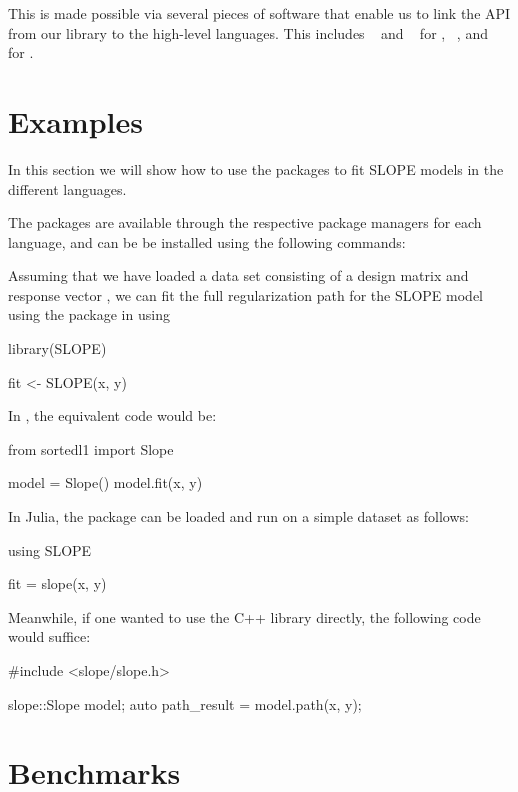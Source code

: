 \documentclass[article]{jss}
\begin{document}
This is made possible via several pieces of software that enable us to link the
API from our  library to the high-level languages. This includes
~\citep{eddelbuettel2011} and ~\citep{bates2013} for
, ~\citep{jakob2025}, and ~\citep{janssens2020} for
.

\section{Examples}

In this section we will show how to use the packages to fit SLOPE models in
the different languages.

The packages are
available through the respective package managers for each language, and can be
be installed using the following commands:

\begin{description}[labelwidth=8ex]
  \item[\proglang{R}] 
  \item[\proglang{Python}] 
  \item[\proglang{Julia}] 
\end{description}

Assuming that we have loaded a data set consisting of a design
matrix  and response vector , we can fit the full regularization
path for the SLOPE model using the
 package in  using
\begin{Code}
  library(SLOPE)

  fit <- SLOPE(x, y)
\end{Code}

In , the equivalent code would be:
\begin{Code}
  from sortedl1 import Slope

  model = Slope()
  model.fit(x, y)
\end{Code}

In Julia, the package can be loaded and run on a simple dataset as follows:
\begin{Code}
  using SLOPE

  fit = slope(x, y)
\end{Code}

Meanwhile, if one wanted to use the C++ library directly, the following code
would suffice:
\begin{Code}
  #include <slope/slope.h>

  slope::Slope model;
  auto path_result = model.path(x, y);
\end{Code}

\section{Benchmarks}



\newpage

\begin{appendix}

\end{appendix}
\end{document}

